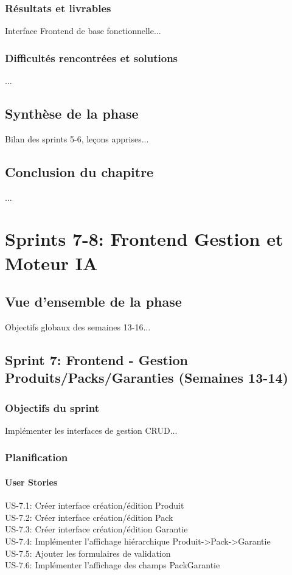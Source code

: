 \documentclass[12pt,a4paper]{report}
\begin{document}
\subsection{Résultats et livrables}
Interface Frontend de base fonctionnelle...

\subsection{Difficultés rencontrées et solutions}
...

\section{Synthèse de la phase}
Bilan des sprints 5-6, leçons apprises...

\section{Conclusion du chapitre}
...

\chapter{Sprints 7-8: Frontend Gestion et Moteur IA}
\label{chap:sprints7-8}

\section{Vue d'ensemble de la phase}
Objectifs globaux des semaines 13-16...

\section{Sprint 7: Frontend - Gestion Produits/Packs/Garanties (Semaines 13-14)}
\subsection{Objectifs du sprint}
Implémenter les interfaces de gestion CRUD...

\subsection{Planification}
\subsubsection{User Stories}
US-7.1: Créer interface création/édition Produit \\
US-7.2: Créer interface création/édition Pack \\
US-7.3: Créer interface création/édition Garantie \\
US-7.4: Implémenter l'affichage hiérarchique Produit->Pack->Garantie \\
US-7.5: Ajouter les formulaires de validation \\
US-7.6: Implémenter l'affichage des champs PackGarantie
\end{document}

